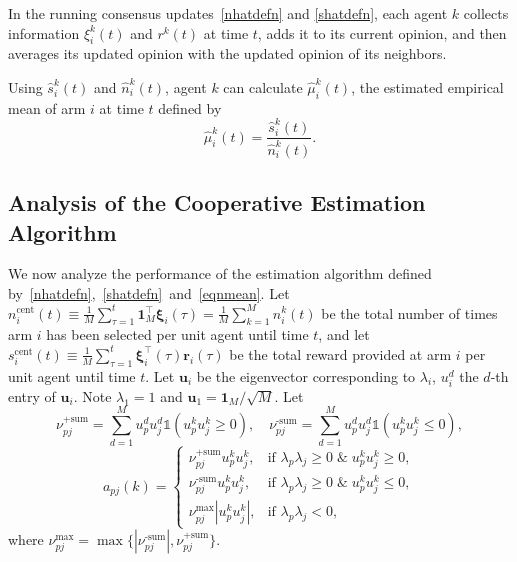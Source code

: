 \documentclass[final,5p,times,twocolumn]{elsarticle}
\theoremstyle{definition}
\begin{document}
In the running consensus updates~\eqref{nhatdefn} and \eqref{shatdefn}, each agent $k$ collects information $\xi_i^k(t)$ and {$r^k(t)$} at time $t$, adds it to its current opinion, and then averages its updated opinion with the updated opinion of its neighbors.



 Using $\hat{s}_i^k(t) $ and  $\hat{n}_i^k(t)$, agent $k$ can calculate $\hat{\mu}_i^k(t)$, the estimated empirical mean of arm $i$ at time $t$ defined by
\begin{equation}
\hat{ \mu}_i^{k}(t) = \frac{\hat{s}_i^{k}(t)}{\hat{n}_i^{k}(t)}.  \label{eqnmean}
\end{equation}




\subsection{Analysis of the Cooperative Estimation Algorithm}
We now analyze the performance of the estimation algorithm defined by~\eqref{nhatdefn},~\eqref{shatdefn}~and~\eqref{eqnmean}. Let $n_i^{\text{cent}}(t) \equiv \frac{1}{M} \sum_{\tau=1}^t \mathbf{1}_M^\top \boldsymbol{\xi}_i(\tau) =\frac{1}{M} \sum_{k=1}^M n_i^k(t)$ be the total number of times arm $i$ has been selected per unit agent {until} time {$t$}, and let $s_i^{\text{cent}}(t) \equiv \frac{1}{M} \sum_{\tau=1}^t \boldsymbol{\xi}_i^\top(\tau) \mathbf{r}_i(\tau)$ be the
total reward provided at arm $i$ per unit agent {until} time $t$.  Let 
$\mathbf{u}_i$ be the eigenvector corresponding to $\lambda_i$, $u_i^d$  the $d$-th entry of $\mathbf{u}_i$. Note $\lambda_1=1$ and $\mathbf{u}_1 = \mathbf{1}_M/\sqrt{M}$. Let
\[
 \nu_{pj}^{\text{+sum}} = \sum_{d=1}^M  u_p^d u_j^d \mathds{1}(u_p^k u_j^k \geq 0),  
  \quad \nu_{pj}^{\text{-sum}} =  \sum_{d=1}^M u_p^d u_j^d \mathds{1}(u_p^k u_j^k \leq 0), 
\]
\begin{equation}
a_{pj}(k) =  \begin{cases}
\nu_{pj}^{\text{+sum}}u_p^k u_j^k, & 
\! \! \! \! \text{if } \lambda_p \lambda_j \geq 0 \; \&\; u_p^k u_j^k  \geq 0, \\
\nu_{pj}^{\text{-sum}}u_p^k u_j^k, &
\! \! \! \! \text{if }  \lambda_p \lambda_j \geq 0 \; \&\; u_p^k u_j^k  \leq 0, \\
\nu_{pj}^{\text{max}} |u_p^k u_j^k | , & \! \! \! \! \text{if }  \lambda_p \lambda_j < 0,
\end{cases}\label{apjdefn}
\end{equation}
where $\nu_{pj}^{\text{max}} = \max{\{ |\nu_{pj}^{\text{-sum}}|,  \nu_{pj}^{\text{+sum}}\}} $.
\end{document}
